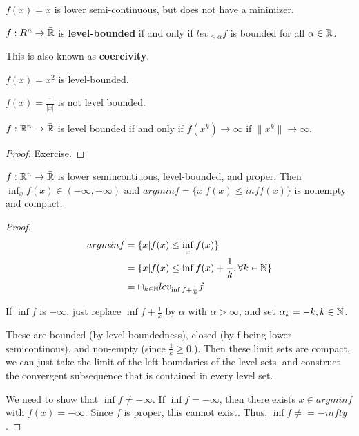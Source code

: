 $f(x) = x$ is lower semi-continuous, but does not have a minimizer.
\begin{defn}
  \label{defn:new_convex:3}
  $f: R^{n} \rightarrow \bar {\mathbb{R}}$ is \textbf{level-bounded} if and only
  if $lev_{\leq \alpha} f$ is bounded for all $\alpha \in \mathbb{R}$.

  This is also known as \textbf{coercivity}.
\end{defn}

\begin{exmp}
  \label{defn:new_convex:4}
  $f(x) = x^{2}$ is level-bounded.

  $f(x) = \frac{1}{|x|}$ is not level bounded.
\end{exmp}

\begin{thm}
  \label{defn:new_convex:5}
  $f: \mathbb{R}^{n} \rightarrow \bar {\mathbb{R}}$ is level bounded if and only if
  $f(x^{k}) \rightarrow \infty$ if $\| x^{k} \| \rightarrow \infty$.
\end{thm}

\begin{proof}
  Exercise.
\end{proof}


\begin{thm}
  \label{defn:new_convex:6}
  $f: \mathbb{R}^{n} \rightarrow \bar {\mathbb{R}}$ is lower semincontiuous,
  level-bounded, and proper. Then $\inf_{x} f(x) \in (-\infty,
  +\infty)$ and $argmin f = \{ x | f(x) \leq inf f(x) \}$ is nonempty and compact.
\end{thm}

\begin{proof}
  \begin{align}
    \label{eq:9}
    arg min f &= \{ x | f(x) \leq \inf_{x} f(x) \} \\
    &= \{ x | f(x) \leq \inf f(x)  + \frac{1}{k}, \forall k \in \mathbb{N} \}
  \\
  &= \cap_{k \in \mathbb{N}} lev_{\inf f + \frac{1}{k}} f
\end{align}

 If $\inf f$ is $-\infty$, just replace $\inf f + \frac{1}{k}$ by
 $\alpha$ with $\alpha > \infty$, and set $\alpha_{k} = -k, k \in \mathbb{N}$.
 
 These are bounded (by level-boundedness), closed (by f
 being lower semicontinous), and non-empty (since $\frac{1}{k} \geq
 0$.).  Then these limit sets are compact, we can just take the limit
 of the left boundaries of the level sets, and construct the
 convergent subsequence that is contained in every level set.

 We need to show that $\inf f \neq -\infty$.  If $\inf f = -\infty$,
 then there exists $x \in argmin f$ with $f(x) = -\infty$.  Since $f$
 is proper, this cannot exist. Thus, $\inf f \neq = -infty$.
\end{proof}

